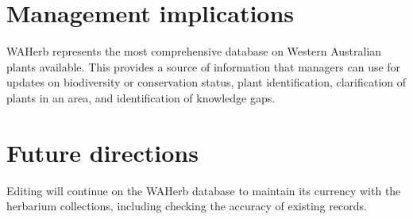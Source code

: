 \documentclass[version=last,
    paper=a4, %
    10pt, %
    usenames,
    dvipsnames,
    oneside, %
    headings=openany, %
    DIV=15 %
]{scrbook}
\begin{document}
\section*{Management implications}

WAHerb represents the most comprehensive database on Western Australian
plants available. This provides a source of information that managers
can use for updates on biodiversity or conservation status, plant
identification, clarification of plants in an area, and identification
of knowledge gaps.




\section*{Future directions}

Editing will continue on the WAHerb database to maintain its currency
with the herbarium collections, including checking the accuracy of
existing records.



\end{document}
